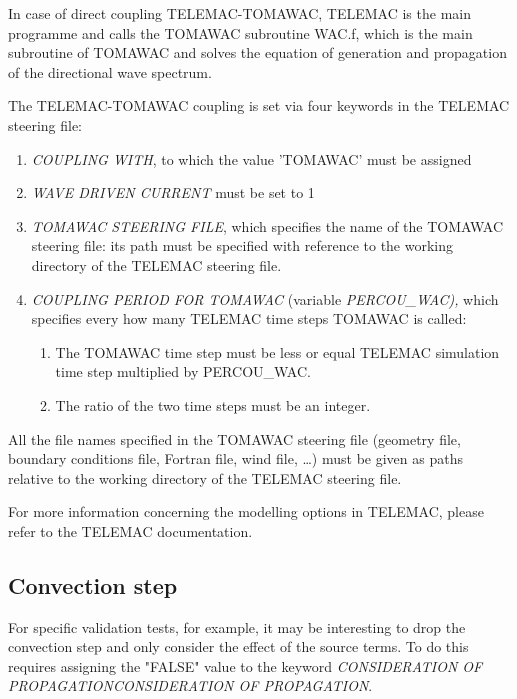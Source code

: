  In case of direct coupling TELEMAC-TOMAWAC, TELEMAC is the main programme and calls the TOMAWAC subroutine WAC.f, which is the main subroutine of TOMAWAC and solves the equation of generation and propagation of the directional wave spectrum.

 The TELEMAC-TOMAWAC coupling is set via four keywords in the TELEMAC steering file:

\begin{enumerate}
\item  \textit{COUPLING WITH}, to which the value 'TOMAWAC' must be assigned

\item  \textit{WAVE DRIVEN CURRENT} must be set to 1

\item  \textit{TOMAWAC STEERING FILE}, which specifies the name of the TOMAWAC steering file: its path must be specified with reference to the working directory of the TELEMAC steering file.

\item  \textit{COUPLING PERIOD FOR TOMAWAC} (variable \textit{PERCOU\_WAC),} which specifies every how many TELEMAC time steps TOMAWAC is called:

\begin{enumerate}
\item  The TOMAWAC time step must be less or equal TELEMAC simulation time step multiplied by PERCOU\_WAC.

\item  The ratio of the two time steps must be an integer.
\end{enumerate}
\end{enumerate}

 All the file names specified in the TOMAWAC steering file (geometry file, boundary conditions file, Fortran file, wind file, \dots ) must be given as paths relative to the working directory of the TELEMAC steering file.

 For more information concerning the modelling options in TELEMAC, please refer to the TELEMAC documentation.


\subsection{ Convection step}

 For specific validation tests, for example, it may be interesting to drop the convection step and only consider the effect of the source terms. To do this requires assigning the "FALSE" value to the keyword \textit{CONSIDERATION OF PROPAGATIONCONSIDERATION OF PROPAGATION}.


